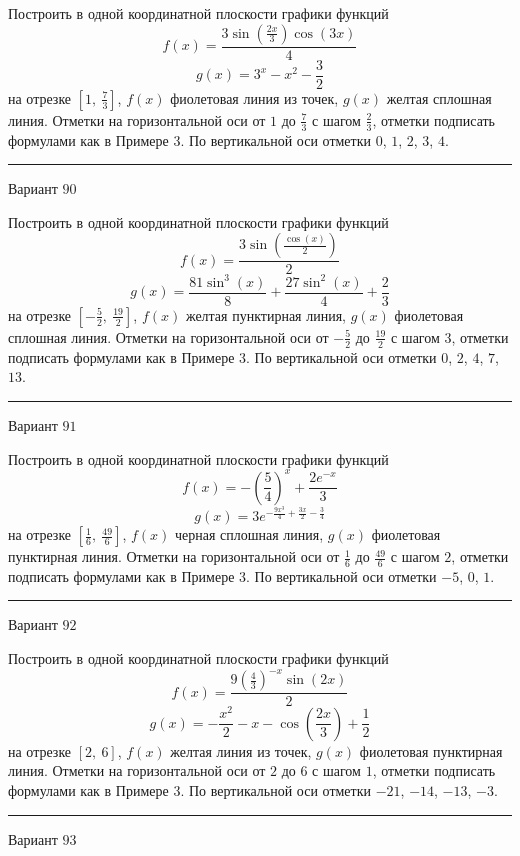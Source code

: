 \documentclass[11pt]{report}
\begin{document}
Построить в одной координатной плоскости графики функций $$f(x) = \frac{3 \sin{\left(\frac{2 x}{3} \right)} \cos{\left(3 x \right)}}{4}$$ $$g(x) = 3^{x} - x^{2} - \frac{3}{2}$$ на отрезке $\left[1, \  \frac{7}{3}\right]$, $f(x)$ фиолетовая линия из точек, $g(x)$ желтая сплошная линия. Отметки на горизонтальной оси от $1$ до $\frac{7}{3}$ с шагом $\frac{2}{3}$, отметки подписать формулами как в Примере 3. По вертикальной оси отметки $0$, $1$, $2$, $3$, $4$.
\begin{center}
\noindent\rule{8cm}{0.4pt}
\end{center}
Вариант $90$


Построить в одной координатной плоскости графики функций $$f(x) = \frac{3 \sin{\left(\frac{\cos{\left(x \right)}}{2} \right)}}{2}$$ $$g(x) = \frac{81 \sin^{3}{\left(x \right)}}{8} + \frac{27 \sin^{2}{\left(x \right)}}{4} + \frac{2}{3}$$ на отрезке $\left[- \frac{5}{2}, \  \frac{19}{2}\right]$, $f(x)$ желтая пунктирная линия, $g(x)$ фиолетовая сплошная линия. Отметки на горизонтальной оси от $- \frac{5}{2}$ до $\frac{19}{2}$ с шагом $3$, отметки подписать формулами как в Примере 3. По вертикальной оси отметки $0$, $2$, $4$, $7$, $13$.
\begin{center}
\noindent\rule{8cm}{0.4pt}
\end{center}
Вариант $91$


Построить в одной координатной плоскости графики функций $$f(x) = - \left(\frac{5}{4}\right)^{x} + \frac{2 e^{- x}}{3}$$ $$g(x) = 3 e^{- \frac{9 x^{3}}{4} + \frac{3 x}{2} - \frac{3}{4}}$$ на отрезке $\left[\frac{1}{6}, \  \frac{49}{6}\right]$, $f(x)$ черная сплошная линия, $g(x)$ фиолетовая пунктирная линия. Отметки на горизонтальной оси от $\frac{1}{6}$ до $\frac{49}{6}$ с шагом $2$, отметки подписать формулами как в Примере 3. По вертикальной оси отметки $-5$, $0$, $1$.
\begin{center}
\noindent\rule{8cm}{0.4pt}
\end{center}
Вариант $92$


Построить в одной координатной плоскости графики функций $$f(x) = \frac{9 \left(\frac{4}{3}\right)^{- x} \sin{\left(2 x \right)}}{2}$$ $$g(x) = - \frac{x^{2}}{2} - x - \cos{\left(\frac{2 x}{3} \right)} + \frac{1}{2}$$ на отрезке $\left[2, \  6\right]$, $f(x)$ желтая линия из точек, $g(x)$ фиолетовая пунктирная линия. Отметки на горизонтальной оси от $2$ до $6$ с шагом $1$, отметки подписать формулами как в Примере 3. По вертикальной оси отметки $-21$, $-14$, $-13$, $-3$.
\begin{center}
\noindent\rule{8cm}{0.4pt}
\end{center}
Вариант $93$
\end{document}
